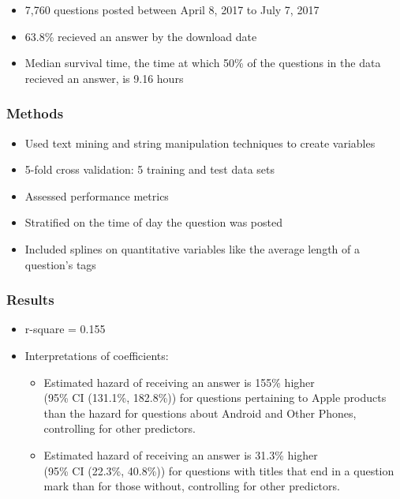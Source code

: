\documentclass{beamer}
\begin{document}
\begin{frame}
\bigskip

  \begin{itemize}
      \item 7,760 questions posted between April 8, 2017 to July 7, 2017
      \item 63.8\% recieved an answer by the download date
      \item Median survival time, the time at which 50\% of the questions in the data recieved an answer, is 9.16 hours
  \end{itemize}
  
\end{frame}

\begin{frame}
\frametitle{Methods}
  
  \begin{itemize}
      \item Used text mining and string manipulation techniques to create variables
      \item 5-fold cross validation: 5 training and test data sets 
      \item Assessed performance metrics
      \item Stratified on the time of day the question was posted
      \item Included splines on quantitative variables like the average length of a question's tags
  \end{itemize}
  
\end{frame}

\begin{frame}
\frametitle{Results}

  \begin{itemize}
      \item r-square = 0.155
  \bigskip
      \item Interpretations of coefficients:
      \begin{itemize}
          \bigskip
          \item Estimated hazard of receiving an answer is 155\% higher \\ (95\% CI (131.1\%, 182.8\%)) 
          for questions pertaining to Apple products than the hazard for questions about Android and Other Phones,
          controlling for other predictors.
          \bigskip
          \item Estimated hazard of receiving an answer is 31.3\% higher \\ (95\% CI (22.3\%, 40.8\%)) 
          for questions with titles that end in a question mark than for those without, 
          controlling for other predictors.
          
      \end{itemize}
  \end{itemize}
  
\end{frame}
\end{document}
